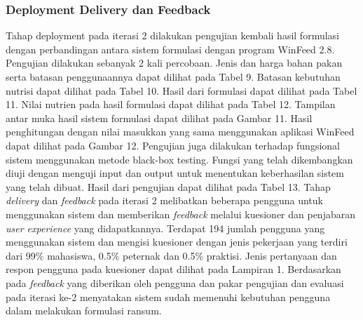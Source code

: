 \subsubsection*{Deployment Delivery dan Feedback}
Tahap deployment pada iterasi 2 dilakukan pengujian kembali hasil formulasi dengan perbandingan antara sistem formulasi dengan program WinFeed 2.8. Pengujian dilakukan sebanyak 2 kali percobaan. Jenis dan harga bahan pakan serta batasan penggunaannya dapat dilihat pada Tabel 9. Batasan kebutuhan nutrisi dapat dilihat pada Tabel 10. Hasil dari formulasi dapat dilihat pada Tabel 11. Nilai nutrien pada hasil formulasi dapat dilihat pada Tabel 12. Tampilan antar muka hasil sistem formulasi dapat dilihat pada Gambar 11. Hasil penghitungan dengan nilai masukkan yang sama menggunakan aplikasi WinFeed dapat dilihat pada Gambar 12. Pengujian juga dilakukan terhadap fungsional sistem menggunakan metode black-box testing. Fungsi yang telah dikembangkan diuji dengan menguji input dan output untuk menentukan keberhasilan sistem yang telah dibuat. Hasil dari pengujian dapat dilihat pada Tabel 13. Tahap \textit{delivery }dan \textit{feedback }pada iterasi 2 melibatkan beberapa pengguna untuk menggunakan sistem dan memberikan \textit{feedback }melalui kuesioner dan penjabaran \textit{user experience }yang didapatkannya. Terdapat 194 jumlah pengguna yang menggunakan sistem dan mengisi kuesioner dengan jenis pekerjaan yang terdiri dari 99\% mahasiswa, 0.5\% peternak dan 0.5\% praktisi. Jenis pertanyaan dan respon pengguna pada kuesioner dapat dilihat pada Lampiran 1. Berdasarkan pada \textit{feedback }yang diberikan oleh pengguna dan pakar pengujian dan evaluasi pada iterasi ke-2 menyatakan sistem sudah memenuhi kebutuhan pengguna dalam melakukan formulasi ransum.